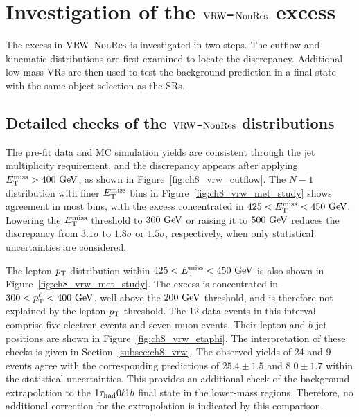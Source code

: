 \chapter[Investigation of the VRW-NonRes excess]{Investigation of the $\mathrm{VRW}$-$\mathrm{NonRes}$ excess}
\label{app:ch8_vrw_excess}
\label{subsec:ch8_vrw_excess}

The excess in $\mathrm{VRW}$-$\mathrm{NonRes}$ is investigated in two steps. The cutflow and kinematic distributions are first examined to locate the discrepancy. Additional low-mass VRs are then used to test the background prediction in a final state with the same object selection as the SRs.

\section[Detailed distribution checks]{Detailed checks of the $\mathrm{VRW}$-$\mathrm{NonRes}$ distributions}

The pre-fit data and MC simulation yields are consistent through the jet multiplicity requirement, and the discrepancy appears after applying $E_{\mathrm{T}}^{\mathrm{miss}}>400~\mathrm{GeV}$, as shown in Figure~\ref{fig:ch8_vrw_cutflow}.
The $N-1$ distribution with finer $E_{\mathrm{T}}^{\mathrm{miss}}$ bins in Figure~\ref{fig:ch8_vrw_met_study} shows agreement in most bins, with the excess concentrated in $425<E_{\mathrm{T}}^{\mathrm{miss}}<450~\mathrm{GeV}$.
Lowering the $E_{\mathrm{T}}^{\mathrm{miss}}$ threshold to $300~\mathrm{GeV}$ or raising it to $500~\mathrm{GeV}$ reduces the discrepancy from $3.1\sigma$ to $1.8\sigma$ or $1.5\sigma$, respectively, when only statistical uncertainties are considered.

The lepton-$p_{\mathrm{T}}$ distribution within $425<E_{\mathrm{T}}^{\mathrm{miss}}<450~\mathrm{GeV}$ is also shown in Figure~\ref{fig:ch8_vrw_met_study}.
The excess is concentrated in $300<p_{\mathrm{T}}^\ell<400~\mathrm{GeV}$, well above the $200~\mathrm{GeV}$ threshold, and is therefore not explained by the lepton-$p_{\mathrm{T}}$ threshold.
The 12 data events in this interval comprise five electron events and seven muon events.
Their lepton and $b$-jet positions are shown in Figure~\ref{fig:ch8_vrw_etaphi}.
The interpretation of these checks is given in Section~\ref{subsec:ch8_vrw}. The observed yields of 24 and 9 events agree with the corresponding predictions of $25.4\pm1.5$ and $8.0\pm1.7$ within the statistical uncertainties. This provides an additional check of the background extrapolation to the $1\tau_{\mathrm{had}}0\ell1b$ final state in the lower-mass regions. Therefore, no additional correction for the extrapolation is indicated by this comparison.


\clearpage

